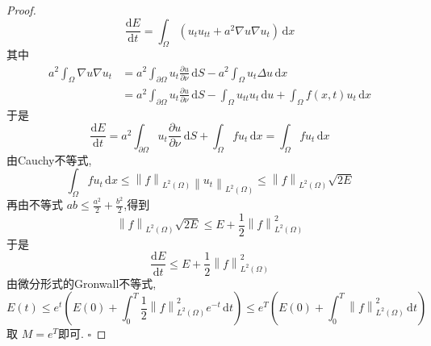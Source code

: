 \documentclass[../../main.tex]{subfiles}
\begin{document}
\begin{proof}
     \[
     \frac{\mathrm{d}E}{\mathrm{d}t}=  \int_{ \Omega }\left( u_{t}u_{tt}+ a^{2} \nabla u \nabla u_{t} \right)\,\mathrm{d} x 
     \]其中 \[
   \begin{aligned}
     a^{2}\int_{ \Omega } \nabla u \nabla u_{t}&=  a^{2}\int_{ \partial  \Omega }u_{t} \frac{\partial u}{\partial \nu }\,\mathrm{d} S- a^{2} \int_{ \Omega }u_{t} \Delta u\,\mathrm{d} x\\ 
      &=  a^{2}\int_{ \partial  \Omega }u_{t} \frac{\partial u}{\partial \nu}\,\mathrm{d} S- \int_{ \Omega }u_{tt}u_{t}\,\mathrm{d} u + \int_{ \Omega }f\left( x,t \right)u_{t}\,\mathrm{d} x 
   \end{aligned}
     \]于是 \[
     \frac{\mathrm{d}E}{\mathrm{d}t}=  a^{2} \int_{ \partial  \Omega }u_{t}\frac{\partial u}{\partial \nu   }\,\mathrm{d} S +  \int_{ \Omega }f u_{t}\,\mathrm{d} x=  \int_{ \Omega } fu_{t}\,\mathrm{d} x
     \]    由Cauchy不等式, \[
     \int_{ \Omega }fu_{t}\,\mathrm{d} x\le \left\| f \right\|_{L^{2}\left(  \Omega  \right) } \left\| u_{t} \right\|_{L^{2}\left(  \Omega  \right) }\le \left\| f \right\|_{L^{2}\left(  \Omega  \right) }\sqrt{2E}
     \]再由不等式 \(  ab\le \frac{a^{2} }{2 }+ \frac{b^{2} }{2 }    \),得到 \[
     \left\| f \right\|_{L^{2}\left(  \Omega  \right) }\sqrt{2E}\le E+  \frac{1}{2}\left\| f \right\|_{L^{2}\left(  \Omega  \right) }^{2}
     \] 于是 \[
     \frac{\mathrm{d}E}{\mathrm{d}t}\le  E+ \frac{1}{2}\left\| f \right\|^{2}_{L^{2}\left(  \Omega  \right) }
     \]由微分形式的Gronwall不等式, \[
     E\left( t \right)\le e^{t}\left( E\left( 0 \right)+ \int_{0}^{T}\frac{1}{2}\left\| f \right\|^{2}_{L^{2}\left(  \Omega  \right) }e^{-t}\,\mathrm{d}  t \right)  \le e^{T}\left( E\left( 0 \right)+  \int_{0}^{T}\left\| f \right\|^{2}_{L^{2}\left(  \Omega  \right) }\,\mathrm{d} t  \right) 
     \]取 \(  M =  e^{T}  \)即可. 
    \hfill $\square$
\end{proof}
\end{document}
